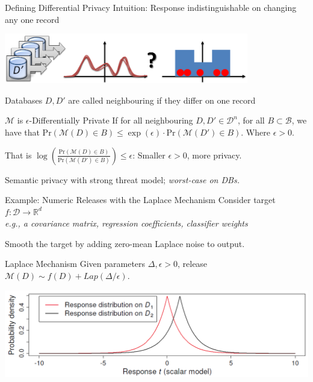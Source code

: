 \documentclass{beamer}
\newcommand{\reals}{\ensuremath{\mathbb{R}}\xspace}
\newcommand{\cB}{\ensuremath{\mathcal{B}}\xspace}
\newcommand{\cD}{\ensuremath{\mathcal{D}}\xspace}
\newcommand{\mech}{\ensuremath{\mathcal{M}}\xspace}
\newcommand{\domain}{\ensuremath{\cD}\xspace}
\newcommand{\eg}{\emph{e.g.},\xspace}
\renewcommand{\Pr}[1]{\ensuremath{\mathrm{Pr}\left(#1\right)}}
\begin{document}
\begin{frame}{Defining Differential Privacy}
Intuition: Response indistinguishable on changing any one record
\begin{center}\includegraphics[width=0.8\textwidth]{figures/indistinguishable}\end{center}

Databases $D, D'$ are called \alert{neighbouring} if they differ on one record

\pause
\begin{alertblock}{\mech is $\epsilon$-Differentially Private}
If for all neighbouring $D, D'\in\domain^n$, for all $B\subset\cB$, we have that 
$\Pr{\mech(D)\in B}\leq\exp(\epsilon)\cdot\Pr{\mech(D')\in B}$. Where $\epsilon>0$.
\end{alertblock}

That is $\log\left(\frac{\Pr{\mech(D)\in B}}{\Pr{\mech(D')\in B}}\right)\leq\epsilon$:
Smaller $\epsilon>0$, more privacy.

Semantic privacy with strong threat model; \emph{worst-case on DBs.}
\end{frame}

\begin{frame}{Example: Numeric Releases with the Laplace Mechanism}
Consider target $f: \domain \to \reals^d$ \\
\textit{\eg a covariance matrix, regression coefficients, classifier weights}

Smooth the target by adding zero-mean Laplace noise to output.

\begin{alertblock}{Laplace Mechanism}
Given parameters $\Delta, \epsilon>0$, release 
$\mech(D) \sim f(D) + Lap(\Delta / \epsilon)$.
\end{alertblock}

\begin{center}\includegraphics[width=1.0\textwidth]{figures/laplace-proof}\end{center}

\end{frame}
\end{document}
